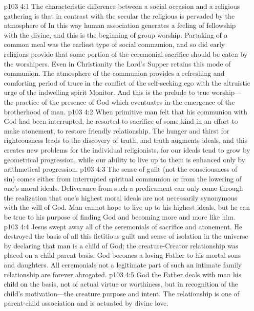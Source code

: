 \vs p103 4:1 The characteristic difference between a social occasion and a religious gathering is that in contrast with the secular the religious is pervaded by the atmosphere of  In this way human association generates a feeling of fellowship with the divine, and this is the beginning of group worship. Partaking of a common meal was the earliest type of social communion, and so did early religions provide that some portion of the ceremonial sacrifice should be eaten by the worshipers. Even in Christianity the Lord’s Supper retains this mode of communion. The atmosphere of the communion provides a refreshing and comforting period of truce in the conflict of the self\hyp{}seeking ego with the altruistic urge of the indwelling spirit Monitor. And this is the prelude to true worship---the practice of the presence of God which eventuates in the emergence of the brotherhood of man.
\vs p103 4:2 When primitive man felt that his communion with God had been interrupted, he resorted to sacrifice of some kind in an effort to make atonement, to restore friendly relationship. The hunger and thirst for righteousness leads to the discovery of truth, and truth augments ideals, and this creates new problems for the individual religionists, for our ideals tend to grow by geometrical progression, while our ability to live up to them is enhanced only by arithmetical progression.
\vs p103 4:3 The sense of guilt (not the consciousness of sin) comes either from interrupted spiritual communion or from the lowering of one’s moral ideals. Deliverance from such a predicament can only come through the realization that one’s highest moral ideals are not necessarily synonymous with the will of God. Man cannot hope to live up to his highest ideals, but he can be true to his purpose of finding God and becoming more and more like him.
\vs p103 4:4 Jesus swept away all of the ceremonials of sacrifice and atonement. He destroyed the basis of all this fictitious guilt and sense of isolation in the universe by declaring that man is a child of God; the creature\hyp{}Creator relationship was placed on a child\hyp{}parent basis. God becomes a loving Father to his mortal sons and daughters. All ceremonials not a legitimate part of such an intimate family relationship are forever abrogated.
\vs p103 4:5 God the Father deals with man his child on the basis, not of actual virtue or worthiness, but in recognition of the child’s motivation---the creature purpose and intent. The relationship is one of parent\hyp{}child association and is actuated by divine love.
